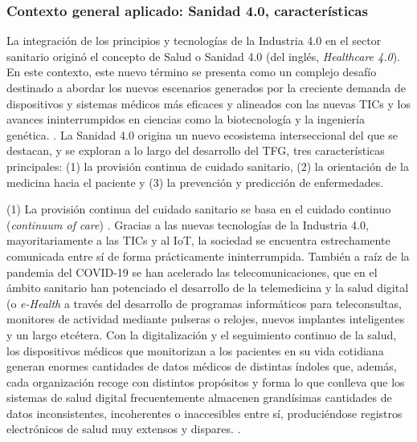 
\subsubsection{Contexto general aplicado: Sanidad 4.0, características}

La integración de los principios y tecnologías de la Industria 4.0 en el sector sanitario originó el concepto de Salud o Sanidad 4.0 (del inglés, \textit{Healthcare 4.0})\cite{tortorella2020healthcare}\cite{tortorella2021impacts}.  %
En este contexto, este nuevo término se presenta como un complejo desafío  destinado a abordar los nuevos escenarios generados por la creciente demanda de dispositivos y sistemas médicos más eficaces y alineados con las nuevas TICs y los avances ininterrumpidos en ciencias como la biotecnología y la ingeniería genética. \cite{martin2021ehealth}. La Sanidad 4.0 origina un nuevo ecosistema interseccional del que se destacan, y se exploran a lo largo del desarrollo del TFG,  tres  características principales: (1) la provisión continua de cuidado sanitario, (2) la orientación de la medicina hacia el paciente y (3) la prevención y predicción de enfermedades.


(1) La provisión continua del cuidado sanitario se basa en el cuidado continuo (\textit{continuum of care}) \cite{kouroubali2019new}. Gracias a las nuevas tecnologías de la Industria 4.0, mayoritariamente a las TICs y al IoT, la sociedad se encuentra estrechamente comunicada entre sí de forma prácticamente ininterrumpida. También a raíz de la pandemia del COVID-19 se han acelerado las telecomunicaciones, que en el ámbito sanitario han potenciado el desarrollo de la telemedicina y la salud digital (o \textit{e-Health} \cite{martin2021ehealth} a través del desarrollo de programas informáticos para teleconsultas, monitores de actividad mediante pulseras o relojes, nuevos implantes inteligentes y un largo etcétera. Con la digitalización y el seguimiento continuo de la salud, los dispositivos médicos que monitorizan a los pacientes en su vida cotidiana generan enormes cantidades de datos médicos de distintas índoles que, además, cada organización recoge con distintos propósitos y forma lo que conlleva que los sistemas de salud digital frecuentemente almacenen grandísimas cantidades de datos inconsistentes, incoherentes o inaccesibles entre sí, produciéndose registros electrónicos de salud muy extensos y dispares. \cite{kouroubali2019new}. 

